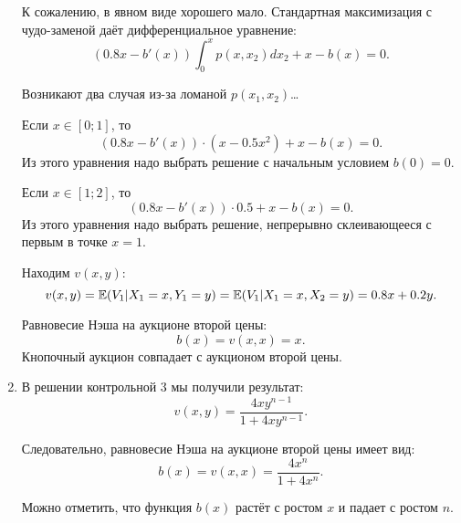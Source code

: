 \begin{enumerate}


К сожалению, в явном виде хорошего мало. Стандартная максимизация с чудо-заменой даёт дифференциальное уравнение:
\begin{equation}
(0.8x-b'(x))\int_{0}^{x}p(x,x_{2})dx_{2}+x-b(x)=0.
\end{equation}

Возникают два случая из-за ломаной $ p(x_{1},x_{2}) $\ldots

Если $ x\in [0;1] $, то
\begin{equation}
(0.8x-b'(x))\cdot (x-0.5x^{2})+x-b(x)=0.
\end{equation}
Из этого уравнения надо выбрать решение с начальным условием $ b(0)=0 $.

Если $ x\in [1;2] $, то
\begin{equation}
(0.8x-b'(x))\cdot 0.5+x-b(x)=0.
\end{equation}
Из этого уравнения надо выбрать решение, непрерывно склеивающееся с первым в точке $x=1$.


Находим $ v(x,y) $:
\begin{equation}
v(x,y)=\operatorname{\mathbb{E}}(V_{1}|X_{1}=x,Y_{1}=y)=\operatorname{\mathbb{E}}(V_{1}|X_{1}=x,X_{2}=y)=0.8x+0.2y.
\end{equation}

Равновесие Нэша на аукционе второй цены:
\begin{equation}
b(x)=v(x,x)=x.
\end{equation}
Кнопочный аукцион совпадает с аукционом второй цены.


\item В решении контрольной 3 мы получили результат:
\begin{equation}
v(x,y)=\frac{4xy^{n-1}}{1+4xy^{n-1}}.
\end{equation}

Следовательно, равновесие Нэша на аукционе второй цены имеет вид:
\begin{equation}
b(x)=v(x,x)=\frac{4x^{n}}{1+4x^{n}}.
\end{equation}

Можно отметить, что функция $b(x)$ растёт с ростом $ x $ и падает с ростом $ n $.


\end{enumerate}
